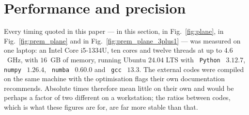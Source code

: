 \documentclass[final,5p,times,twocolumn]{elsarticle}
\newcommand{\fig}{Fig.}
\newcommand{\figu}[1]{\fig~\ref{fig:#1}}
\providecommand{\DIFaddtex}[1]{{\protect\color{blue} \sf #1}} %
\providecommand{\DIFaddbegin}{} %
\providecommand{\DIFadd}[1]{\DIFaddtex{#1}} %
\begin{document}
\DIFaddbegin \section{\DIFadd{Performance and precision}}
\label{section:performance}

\DIFadd{Every timing quoted in this paper --- in this section, in \figu{plane}, in \figu{prem_plane} and in \figu{prem_plane_3plus1} --- was measured on one laptop: an Intel Core i5-1334U, ten cores and twelve threads at up to $4.6$~GHz, with $16$~GB of memory, running Ubuntu $24.04$ LTS with }{\tt \DIFadd{Python}}\DIFadd{~$3.12.7$, }{\tt \DIFadd{numpy}}\DIFadd{~$1.26.4$, }{\tt \DIFadd{numba}}\DIFadd{~$0.60.0$ and }{\tt \DIFadd{gcc}}\DIFadd{~$13.3$.  The external codes were compiled on the same machine with the optimisation flags their own documentation recommends.  Absolute times therefore mean little on their own and would be perhaps a factor of two different on a workstation; the ratios between codes, which is what these figures are for, are far more stable than that.
}
\end{document}
